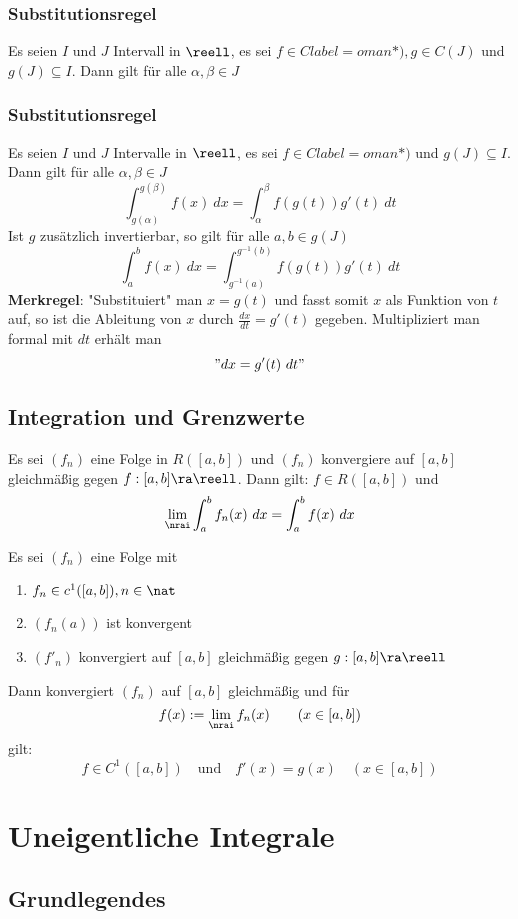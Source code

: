 \documentclass{kit}
\begin{document}
    \subsubsection{Substitutionsregel}
      Es seien $I$ und $J$ Intervall in $\reell$, es sei $f\in Clabel=
oman*),g\in C(J)$ und $g(J)\subseteq I$. Dann gilt für alle $\alpha,\beta\in J$
    \subsubsection{Substitutionsregel}
      Es seien $I$ und $J$ Intervalle in $\reell$, es sei $f\in Clabel=
oman*)$ und $g(J)\subseteq I$. Dann gilt für alle $\alpha,\beta\in J$
      $$\int^{g(\beta)}_{g(\alpha)}f(x)\ dx=\int^\beta_\alpha f(g(t))g'(t)\ dt$$
      Ist $g$ zusätzlich invertierbar, so gilt für alle $a,b\in g(J)$
      $$\int^b_af(x)\ dx=\int^{g^{-1}(b)}_{g^{-1}(a)}f(g(t))g'(t)\ dt$$
      \textbf{Merkregel}: "Substituiert" man $x=g(t)$ und fasst somit $x$ als Funktion von $t$ auf, so ist die Ableitung von $x$ durch $\frac{dx}{dt}=g'(t)$ gegeben. Multipliziert man formal mit $dt$ erhält man
      $$"dx=g'(t)\ dt"$$
  \subsection{Integration und Grenzwerte}
    Es sei $(f_n)$ eine Folge in $R([a,b])$ und $(f_n)$ konvergiere auf $[a,b]$ gleichmäßig gegen $f:[a,b]\ra\reell$. Dann gilt: $f\in R([a,b])$ und
    $$\lim_\nrai\int^b_af_n(x)\ dx=\int^b_af(x)\ dx$$

    Es sei $(f_n)$ eine Folge mit
    \begin{enumerate}[label=\roman*)]
      \item $f_n\in c^1([a,b]),n\in\nat$
      \item $(f_n(a))$ ist konvergent
      \item $(f'_n)$ konvergiert auf $[a,b]$ gleichmäßig gegen $g:[a,b]\ra\reell$
    \end{enumerate}
    Dann konvergiert $(f_n)$ auf $[a,b]$ gleichmäßig und für
    $$f(x):=\lim_\nrai f_n(x)\qquad(x\in[a,b])$$
    gilt:
    $$f\in C^1([a,b])\quad\text{und}\quad f'(x)=g(x)\quad(x\in[a,b])$$
\section{Uneigentliche Integrale}
  \subsection{Grundlegendes}
\end{document}
